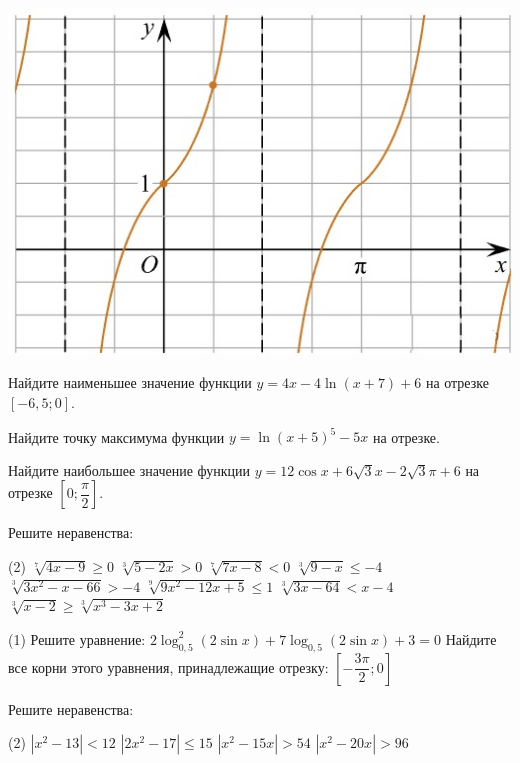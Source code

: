 \begin{homework}[number=3]
\begin{listofex}
\begin{minipage}[t]{\picwidth}
			\includegraphics[align=t, width=\linewidth]{../pics/MECGERM6H3-2.jpg}
		\end{minipage}
		\item Найдите наименьшее значение функции \( y=4x-4 \ln(x+7)+6 \) на отрезке \( [-6,5;0] \). %
		\item Найдите точку максимума функции \( y=\ln(x+5)^5-5x \) на отрезке. %
		\item Найдите наибольшее значение функции \( y=12\cos x + 6\sqrt{3} x - 2 \sqrt{3} \pi + 6 \) на отрезке \( \left[ 0; \dfrac{ \pi }{ 2 } \right]  \).
	\end{listofex}
\end{homework}

\begin{class}[number=7]
	\begin{listofex}
		\item Решите неравенства: %
		\begin{tasks}(2)
			\task \( \sqrt[ 7 ]{ 4x-9 } \ge 0 \) %
			\task \( \sqrt[ 3 ]{ 5-2x } >0 \) %
			\task \( \sqrt[ 7]{ 7x-8 } < 0 \) %
			\task \( \sqrt[ 3 ]{ 9-x } \le -4 \) %
			\task \( \sqrt[ 3 ]{ 3x^2-x-66 } > -4 \) %
			\task \( \sqrt[ 9 ]{ 9x^2-12x+5 } \le 1 \) %
			\task \( \sqrt[ 3 ]{ 3x-64 } < x-4 \) %
			\task \( \sqrt[ 3 ]{ x-2 } \ge \sqrt[ 3 ]{ x^3-3x+2 } \) %
		\end{tasks}
		\item %
		\begin{tasks}(1) 
			\task Решите уравнение: \( 2\log_{0,5}^2 (2\sin x) + 7 \log_{0,5} (2\sin x) + 3 = 0 \)
			\task Найдите все корни этого уравнения, принадлежащие отрезку: \( \left[ -\dfrac{3\pi}{2};0 \right] \)
		\end{tasks}
		
		\item Решите неравенства: %
		\begin{tasks}(2)
			\task \( |x^2-13| < 12 \)
			\task \( |2x^2-17| \le 15 \)
			\task \( |x^2-15x| > 54 \)
			\task \( |x^2-20x|>96 \)
		\end{tasks}
	\end{listofex}
\end{class}

